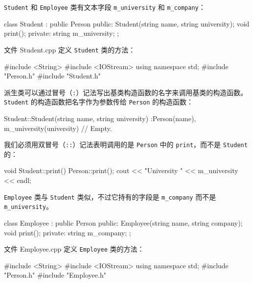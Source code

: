 \texttt{Student} 和 \texttt{Employee} 类有文本字段 \texttt{m\_university} 和 \texttt{m\_company}：

\medskip{}

\begin{codebox}
class Student : public Person {
  public:
    Student(string name, string university);
    void print();
  private:
    string m_university;
};
\end{codebox}

文件 Student.cpp 定义 \texttt{Student} 类的方法：

\medskip{}

\begin{codebox}
#include <String>
#include <IOStream>
using namespace std;
#include "Person.h"
#include "Student.h"
\end{codebox}

派生类可以通过冒号（\texttt{:}）记法写出基类构造函数的名字来调用基类的构造函数。\texttt{Student} 的构造函数把名字作为参数传给 \texttt{Person} 的构造函数：

\begin{codebox}
Student::Student(string name, string university)
  :Person(name),
   m_university(university) {
  // Empty.
}
\end{codebox}

我们必须用双冒号（\texttt{::}）记法表明调用的是 \texttt{Person} 中的 \texttt{print}，而不是 \texttt{Student} 的：

\begin{codebox}
void Student::print() {
  Person::print();
  cout << "University " << m_university << endl;
}
\end{codebox}

\texttt{Employee} 类与 \texttt{Student} 类似，不过它持有的字段是 \texttt{m\_company} 而不是 \texttt{m\_university}。

\medskip{}

\begin{codebox}
class Employee : public Person {
  public:
    Employee(string name, string company);
    void print();
  private:
    string m_company;
};
\end{codebox}

文件 Employee.cpp 定义 \texttt{Employee} 类的方法：

\medskip{}

\begin{codebox}
#include <String>
#include <IOStream>
using namespace std;
#include "Person.h"
#include "Employee.h"
\end{codebox}

